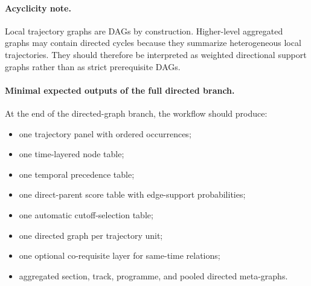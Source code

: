 \paragraph{Acyclicity note.}
Local trajectory graphs are DAGs by construction. Higher-level aggregated graphs may contain
directed cycles because they summarize heterogeneous local trajectories. They should therefore
be interpreted as weighted directional support graphs rather than as strict prerequisite DAGs.

\paragraph{Minimal expected outputs of the full directed branch.}
At the end of the directed-graph branch, the workflow should produce:
\begin{itemize}
    \item one trajectory panel with ordered occurrences;
    \item one time-layered node table;
    \item one temporal precedence table;
    \item one direct-parent score table with edge-support probabilities;
    \item one automatic cutoff-selection table;
    \item one directed graph per trajectory unit;
    \item one optional co-requisite layer for same-time relations;
    \item aggregated section, track, programme, and pooled directed meta-graphs.
\end{itemize}
